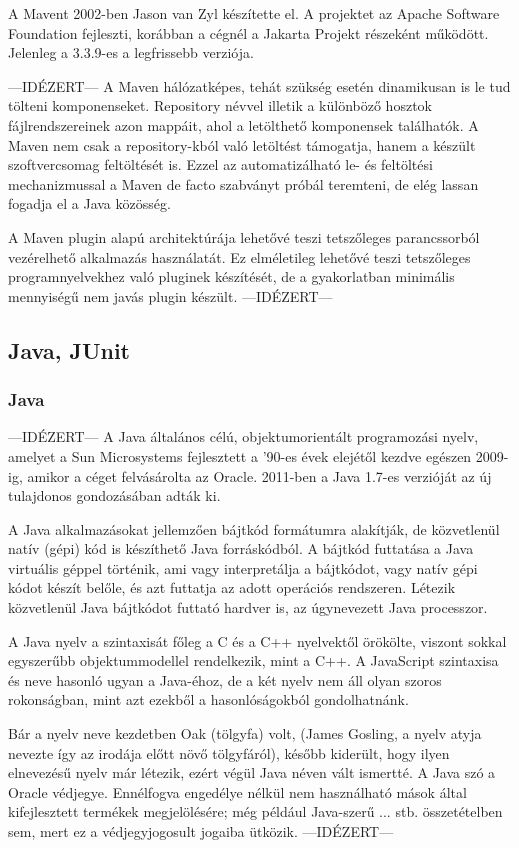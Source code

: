 A Mavent 2002-ben Jason van Zyl készítette el. A projektet az Apache Software Foundation fejleszti, korábban a cégnél a Jakarta Projekt részeként működött. Jelenleg a 3.3.9-es a legfrissebb verziója.

---IDÉZERT---
A Maven hálózatképes, tehát szükség esetén dinamikusan is le tud tölteni komponenseket. Repository névvel illetik a különböző hosztok fájlrendszereinek azon mappáit, ahol a letölthető komponensek találhatók. A Maven nem csak a repository-kból való letöltést támogatja, hanem a készült szoftvercsomag feltöltését is. Ezzel az automatizálható le- és feltöltési mechanizmussal a Maven de facto szabványt próbál teremteni, de elég lassan fogadja el a Java közösség.

A Maven plugin alapú architektúrája lehetővé teszi tetszőleges parancssorból vezérelhető alkalmazás használatát. Ez elméletileg lehetővé teszi tetszőleges programnyelvekhez való pluginek készítését, de a gyakorlatban minimális mennyiségű nem javás plugin készült.
---IDÉZERT---

\subsection{Java, JUnit}

\subsubsection{Java}
---IDÉZERT---
A Java általános célú, objektumorientált programozási nyelv, amelyet a Sun Microsystems fejlesztett a ’90-es évek elejétől kezdve egészen 2009-ig, amikor a céget felvásárolta az Oracle. 2011-ben a Java 1.7-es verzióját az új tulajdonos gondozásában adták ki.

A Java alkalmazásokat jellemzően bájtkód formátumra alakítják, de közvetlenül natív (gépi) kód is készíthető Java forráskódból. A bájtkód futtatása a Java virtuális géppel történik, ami vagy interpretálja a bájtkódot, vagy natív gépi kódot készít belőle, és azt futtatja az adott operációs rendszeren. Létezik közvetlenül Java bájtkódot futtató hardver is, az úgynevezett Java processzor.

A Java nyelv a szintaxisát főleg a C és a C++ nyelvektől örökölte, viszont sokkal egyszerűbb objektummodellel rendelkezik, mint a C++. A JavaScript szintaxisa és neve hasonló ugyan a Java-éhoz, de a két nyelv nem áll olyan szoros rokonságban, mint azt ezekből a hasonlóságokból gondolhatnánk.

Bár a nyelv neve kezdetben Oak (tölgyfa) volt, (James Gosling, a nyelv atyja nevezte így az irodája előtt növő tölgyfáról), később kiderült, hogy ilyen elnevezésű nyelv már létezik, ezért végül Java néven vált ismertté. A Java szó a Oracle védjegye. Ennélfogva engedélye nélkül nem használható mások által kifejlesztett termékek megjelölésére; még például Java-szerű ... stb. összetételben sem, mert ez a védjegyjogosult jogaiba ütközik.
---IDÉZERT---


